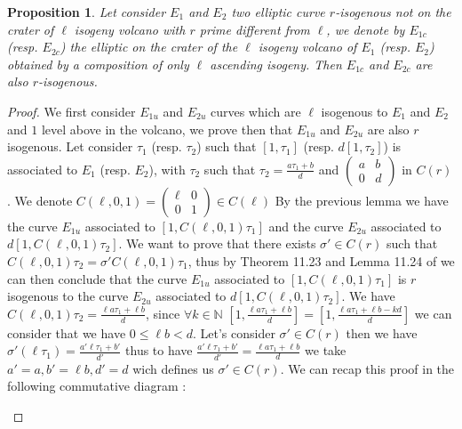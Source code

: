 \documentclass{article}
\theoremstyle{plain}
\newtheorem{prop}[thm]{Proposition}
\theoremstyle{definition}
\theoremstyle{remark}
\begin{document}
\begin{prop}
Let consider $E_1$ and $E_2$ two elliptic curve $r$-isogenous not on the crater of $\ell$ isogeny volcano with $r$ prime different from $\ell$, we denote by $E_{1c}$ (resp. $E_{2c}$) the elliptic on the crater of the $\ell$ isogeny volcano of $E_1$ (resp. $E_2$) obtained by a composition of only $\ell$ ascending isogeny. Then $E_{1c}$ and $E_{2c}$ are also $r$-isogenous.
\end{prop}

\begin{proof}
We first consider $E_{1u}$ and $E_{2u}$ curves which are $\ell$ isogenous to $E_1$ and $E_2$ and $1$ level above in the volcano, we prove then that $E_{1u}$ and $E_{2u}$ are also $r$ isogenous.
\newline
Let consider $\tau_1$ (resp. $\tau_2$)  such that $[1,\tau_1]$ (resp. $d[1,\tau_2]$) is associated to $E_1$ (resp. $E_2$), with $\tau_2$ such that $\tau_2=\frac{a\tau_1+b}{d}$ and $\left(\begin{array}{cc}
a & b\\
0 & d
\end{array}\right)$ in $C(r)$. 
\newline
We denote $C(\ell,0,1)= \left(\begin{array}{cc}
\ell & 0\\
0 & 1
\end{array}\right) \in C(\ell)$
\newline
By the previous lemma we have the curve $E_{1u}$ associated to $[1,C(\ell,0,1)\tau_1]$ and the curve $E_{2u}$ associated to $d[1,C(\ell,0,1)\tau_2]$.
We want to prove that there exists $\sigma' \in C(r)$ such that $C(\ell,0,1)\tau_2=\sigma' C(\ell,0,1)\tau_1$, thus by Theorem 11.23 and Lemma 11.24 of \cite{Cox89} we can then conclude that the curve $E_{1u}$ associated to $[1,C(\ell,0,1)\tau_1]$ is $r$ isogenous to the curve $E_{2u}$ associated to $d[1,C(\ell,0,1)\tau_2]$.
\newline
We have $C(\ell,0,1)\tau_2=\frac{\ell a\tau_1+\ell b}{d}$, since $\forall k \in \mathbb{N}$ $[1,\frac{\ell a\tau_1+\ell b}{d}]=[1,\frac{\ell a\tau_1+\ell b-kd}{d}]$ we can consider that we have $0 \leqslant \ell b<d$.
Let's consider $\sigma' \in C(r)$ then we have $\sigma'(\ell \tau_1)=\frac{a'\ell \tau_1+ b'}{d'}$ thus to have $\frac{a'\ell \tau_1+ b'}{d'}=\frac{\ell a\tau_1+\ell b}{d}$ we take $a'=a, b'=\ell b, d'=d$ wich defines us $\sigma' \in C(r)$. We can recap this proof in the following commutative diagram :
\begin{center}

\end{center}
\end{proof}
\end{document}
